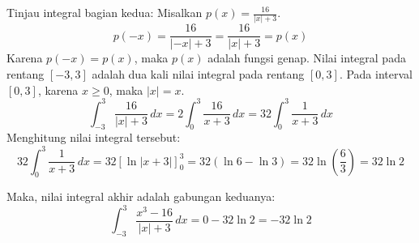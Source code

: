 \documentclass[11pt,openany,a4paper]{article}
\begin{document}
\begin{enumerate}
        Tinjau integral bagian kedua:
        Misalkan $p(x) = \frac{16}{|x| + 3}$.
        \[
          p(-x) = \frac{16}{|-x| + 3} = \frac{16}{|x| + 3} = p(x)
        \]
        Karena $p(-x) = p(x)$, maka $p(x)$ adalah fungsi genap. Nilai integral pada rentang $[-3, 3]$ adalah dua kali nilai integral pada rentang $[0, 3]$. Pada interval $[0, 3]$, karena $x \ge 0$, maka $|x| = x$.
        \[
          \int_{-3}^{3} \frac{16}{|x| + 3} \, dx = 2 \int_{0}^{3} \frac{16}{x + 3} \, dx = 32 \int_{0}^{3} \frac{1}{x + 3} \, dx
        \]
        Menghitung nilai integral tersebut:
        \[
          32 \int_{0}^{3} \frac{1}{x + 3} \, dx = 32 \left[ \ln|x + 3| \right]_{0}^{3} = 32 (\ln 6 - \ln 3) = 32 \ln \left(\frac{6}{3}\right) = 32 \ln 2
        \]
        
        Maka, nilai integral akhir adalah gabungan keduanya:
        \[
          \int_{-3}^{3} \frac{x^3 - 16}{|x| + 3} \, dx = 0 - 32 \ln 2 = -32 \ln 2
        \]
\end{enumerate}
\end{document}
